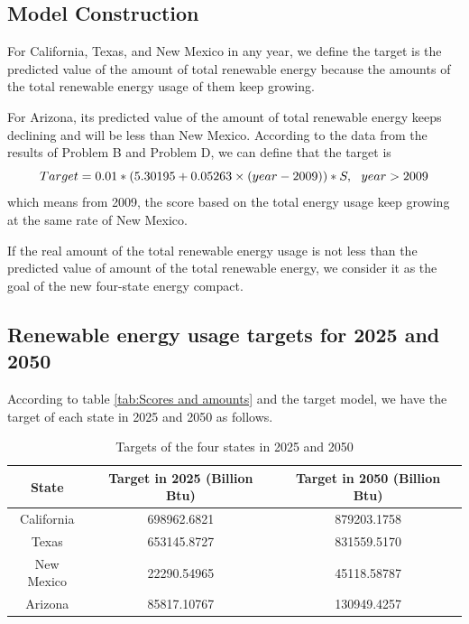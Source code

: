 \documentclass[a4paper,11pt]{article}
\begin{document}
\subsection{Model Construction}
\par For California, Texas, and New Mexico in any year, we define the target is the predicted value of the amount of total renewable energy because the amounts of the total renewable energy usage of them keep growing.
\par For Arizona, its predicted value of the amount of total renewable energy keeps declining and will be less than New Mexico. According to the data from the results of Problem B and Problem D, we can define that the target is
\begin{equation}
    \centering
    Target=0.01*(5.30195+0.05263 \times (year-2009))*S, ~~year>2009
\end{equation}
which means from 2009, the score based on the total energy usage keep growing at the same rate of New Mexico.
\par If the real amount of the total renewable energy usage is not less than the predicted value of amount of the total renewable energy, we consider it as the goal of the new four-state energy compact.
\subsection{Renewable energy usage targets for 2025 and 2050}
\par According to table \ref{tab:Scores and amounts} and the target model, we have the target of each state in 2025 and 2050 as follows.
\begin{table}[H]
    \centering 
    \begin{tabular}{|c|c|c|}
\hline
State & Target in 2025 (Billion Btu) & Target in 2050 (Billion Btu)\\
\hline
California & 698962.6821 & 879203.1758 \\
\hline
Texas & 653145.8727 & 831559.5170 \\
\hline
New Mexico & 22290.54965 & 45118.58787 \\
\hline
Arizona & 85817.10767 & 130949.4257 \\
\hline
\end{tabular}
\caption{Targets of the four states in 2025 and 2050}
\end{table}
\end{document}
